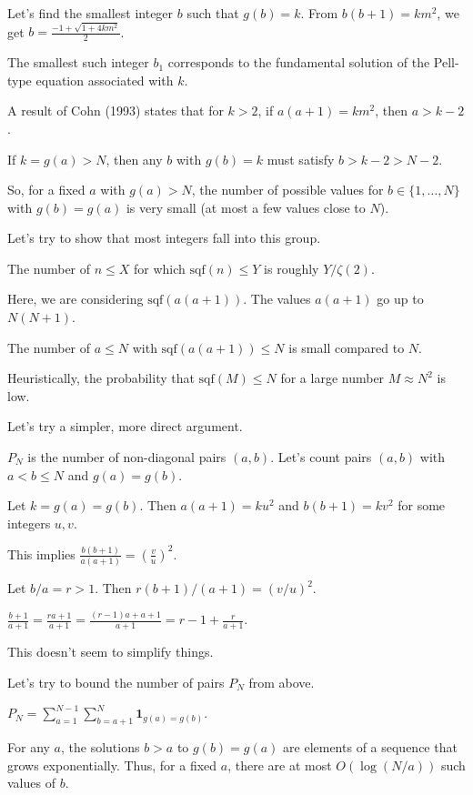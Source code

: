 \documentclass[12pt,a4paper]{article}
\theoremstyle{definition}
\begin{document}
    Let's find the smallest integer $b$ such that $g(b)=k$. From $b(b+1)=km^2$, we get $b=\frac{-1+\sqrt{1+4km^2}}{2}$.

    The smallest such integer $b_1$ corresponds to the fundamental solution of the Pell-type equation associated with $k$.

    A result of Cohn (1993) states that for $k>2$, if $a(a+1)=km^2$, then $a > k-2$.

    If $k=g(a)>N$, then any $b$ with $g(b)=k$ must satisfy $b>k-2 > N-2$.

    So, for a fixed $a$ with $g(a)>N$, the number of possible values for $b \in \{1, \dots, N\}$ with $g(b)=g(a)$ is very small (at most a few values close to $N$).

    Let's try to show that most integers fall into this group.

    The number of $n \leq X$ for which $\text{sqf}(n) \leq Y$ is roughly $Y/\zeta(2)$.

    Here, we are considering $\text{sqf}(a(a+1))$. The values $a(a+1)$ go up to $N(N+1)$.

    The number of $a \leq N$ with $\text{sqf}(a(a+1)) \leq N$ is small compared to $N$.

    Heuristically, the probability that $\text{sqf}(M) \leq N$ for a large number $M \approx N^2$ is low.

    Let's try a simpler, more direct argument.

    $P_N$ is the number of non-diagonal pairs $(a,b)$. Let's count pairs $(a,b)$ with $a<b \leq N$ and $g(a)=g(b)$.

    Let $k=g(a)=g(b)$. Then $a(a+1) = k u^2$ and $b(b+1)=k v^2$ for some integers $u,v$.

    This implies $\frac{b(b+1)}{a(a+1)} = \left(\frac{v}{u}\right)^2$.

    Let $b/a = r > 1$. Then $r(b+1)/(a+1) = (v/u)^2$.

    $\frac{b+1}{a+1} = \frac{ra+1}{a+1} = \frac{(r-1)a+a+1}{a+1} = r-1 + \frac{r}{a+1}$.

    This doesn't seem to simplify things.

    Let's try to bound the number of pairs $P_N$ from above.

    $P_N = \sum_{a=1}^{N-1} \sum_{b=a+1}^N \mathbf{1}_{g(a)=g(b)}$.

    For any $a$, the solutions $b>a$ to $g(b)=g(a)$ are elements of a sequence that grows exponentially. Thus, for a fixed $a$, there are at most $O(\log(N/a))$ such values of $b$.
\end{document}
